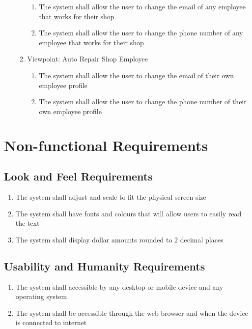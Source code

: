\documentclass[12pt]{article}
\begin{document}
\begin{enumerate}[resume*=business_events]
\begin{enumerate}[VP\arabic*.]
\begin{enumerate}
			            \item The system shall allow the user to change the email of any employee that works for their shop
			            \item The system shall allow the user to change the phone number of any employee that works for their
			                  shop
		            \end{enumerate}
		      \item Viewpoint: Auto Repair Shop Employee
		            \begin{enumerate}
			            \item The system shall allow the user to change the email of their own employee profile
			            \item The system shall allow the user to change the phone number of their own employee profile
		            \end{enumerate}
	      \end{enumerate}
\end{enumerate}

\section{Non-functional Requirements}

\subsection{Look and Feel Requirements}
\begin{enumerate}[LF\arabic*.]
	\item The system shall adjust and scale to fit the physical screen size
	\item The system shall have fonts and colours that will allow users to easily read the text
	\item The system shall display dollar amounts rounded to 2 decimal places
\end{enumerate}

\subsection{Usability and Humanity Requirements}
\begin{enumerate}[UH\arabic*.]
	\item The system shall accessible by any desktop or mobile device and any operating system
	\item The system shall be accessible through the web browser and when the device is connected to internet
\end{enumerate}
\end{document}
